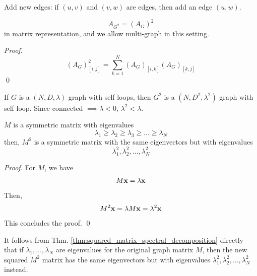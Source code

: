 \begin{definition}
	Add new edges: if $(u, v)$ and $(v, w)$ are edges, then add an edge $(u, w)$. 
\end{definition}

\begin{proposition}
	\begin{equation}
		A_{G^2} = ( A_G ) ^ 2
	\end{equation}
	in matrix representation, and we allow multi-graph in this setting. 
\end{proposition}

\begin{proof}
	\begin{equation}
		(A_G)^2_{[i, j]} = \sum_{k = 1}^N (A_{G})_{[i, k]} (A_{G})_{[k, j]}
	\end{equation}
	\qed
\end{proof}

\begin{proposition}
	If $G$ is a $(N, D, \lambda)$ graph with self loops, then $G^2$ is a $(N, D^2, \lambda^2)$ graph with self loop. Since connected $\implies \lambda < 0$, $\lambda^2 < \lambda$.
\end{proposition}

\begin{theorem}
	\label{thm:squared_matrix_spectral_decomposition}
	$M$ is a symmetric matrix with eigenvalues
	\begin{equation}
		\lambda_1 \geq \lambda_2 \geq \lambda_3 \geq \dots \geq \lambda_N
	\end{equation}
	then, $M^2$ is a symmetric matrix with the same eigenvectors but with eigenvalues
	\begin{equation}
		\lambda_1^2, \lambda_2^2, \dots, \lambda_N^2 
	\end{equation}
\end{theorem}

\begin{proof}
	For $M$, we have
	\begin{equation}
		M\mathbf{x} = \lambda \mathbf{x}
	\end{equation}
	Then, 
	\begin{equation}
		M^2 \mathbf{x} = \lambda M\mathbf{x} = \lambda^2 \mathbf{x}
	\end{equation}
	This concludes the proof. \qed
\end{proof}

\begin{corollary}
	It follows from Thm. \ref{thm:squared_matrix_spectral_decomposition} directly that if $\lambda_1, \dots, \lambda_N$ are eigenvalues for the original graph matrix $M$, then the new squared $M^2$ matrix has the same eigenvectors but with eigenvalues $\lambda_1^2, \lambda_2^2, \dots, \lambda_N^2 $ instead. 
\end{corollary}

